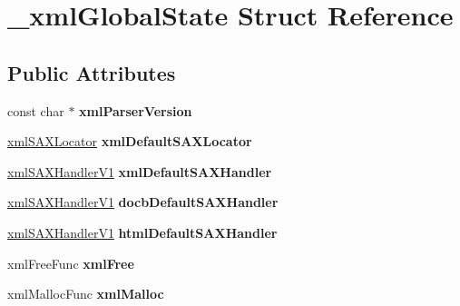 \hypertarget{struct__xml_global_state}{}\section{\+\_\+xml\+Global\+State Struct Reference}
\label{struct__xml_global_state}
\subsection*{Public Attributes}
\begin{DoxyCompactItemize}
\item 
\mbox{\label{struct__xml_global_state_a4af471a525f9377b8bb130c3ec631ba8}} 
const char $\ast$ {\bfseries xml\+Parser\+Version}
\item 
\mbox{\label{struct__xml_global_state_aed1adc9856d172d3de5d036f072cbb1a}} 
\mbox{\hyperlink{struct__xml_s_a_x_locator}{xml\+S\+A\+X\+Locator}} {\bfseries xml\+Default\+S\+A\+X\+Locator}
\item 
\mbox{\label{struct__xml_global_state_a256cd5324f2a89b49e0139c5c8e39ea1}} 
\mbox{\hyperlink{struct__xml_s_a_x_handler_v1}{xml\+S\+A\+X\+Handler\+V1}} {\bfseries xml\+Default\+S\+A\+X\+Handler}
\item 
\mbox{\label{struct__xml_global_state_a2450ebc67fb96e53f0df344907da8f48}} 
\mbox{\hyperlink{struct__xml_s_a_x_handler_v1}{xml\+S\+A\+X\+Handler\+V1}} {\bfseries docb\+Default\+S\+A\+X\+Handler}
\item 
\mbox{\label{struct__xml_global_state_a07e7a66e908fa0aef7bfa9a42e1b2cb7}} 
\mbox{\hyperlink{struct__xml_s_a_x_handler_v1}{xml\+S\+A\+X\+Handler\+V1}} {\bfseries html\+Default\+S\+A\+X\+Handler}
\item 
\mbox{\label{struct__xml_global_state_a842b3e02678910e93737a0c9c520d454}} 
xml\+Free\+Func {\bfseries xml\+Free}
\item 
\mbox{\label{struct__xml_global_state_aa4f9f1f20f477d6d6b108e6ecf7c4561}} 
xml\+Malloc\+Func {\bfseries xml\+Malloc}
\item 

\end{DoxyCompactItemize}
